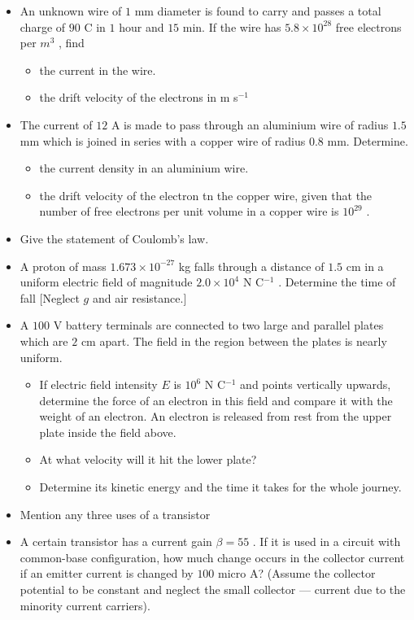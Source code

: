 \documentclass{article}
\begin{document}
\begin{itemize}
\item An unknown wire of $ 1$ mm diameter is found to carry and passes a total charge of $ 90$ C in $ 1$ hour and $ 15$ min. If the wire has $ 5.8 \times 10^{28}$ free electrons per $ m^{3}$ , find
 \begin{itemize}
\item  the current in the wire.
\item the drift velocity of the electrons in m s$ ^{-1}$
\end{itemize}
\item The current of $ 12$ A is made to pass through an aluminium wire of radius $ 1.5$ mm which is joined in series with a copper wire of radius $ 0.8$ mm. Determine.
 \begin{itemize}
\item the current density in an aluminium wire.
\item the drift velocity of the electron tn the copper wire, given that the number of free electrons per unit volume in a copper wire is $ 10^{29}$ .
\end{itemize}
\item Give the statement of Coulomb’s law.
\item A proton of mass $ 1.673 \times 10^{-27}$ kg falls through a distance of $ 1.5$ cm in a uniform electric field of magnitude $ 2.0 \times 10^{4}$ N C$ ^{-1}$ . Determine the time of fall [Neglect $ g$ and air resistance.]
\item A $ 100$ V battery terminals are connected to two large and parallel plates which are $ 2$ cm apart. The field in the region between the plates is nearly uniform. 
 \begin{itemize}
\item If electric field intensity $ E$ is $ 10^{6}$ N C$ ^{-1}$ and points vertically upwards, determine the force of an electron in this field and compare it with the weight of an electron. An electron is released from rest from the upper plate inside the field above.
\item At what velocity will it hit the lower plate?
\item Determine its kinetic energy and the time it takes for the whole journey.
\end{itemize}
\item Mention any three uses of a transistor
\item A certain transistor has a current gain $  \beta =55$ . If it is used in a circuit with common-base configuration, how much change occurs in the collector current if an emitter current is changed by $ 100$ micro A? (Assume the collector potential to be constant and neglect the small collector — current due to the minority current carriers).

\end{itemize}
\end{document}
